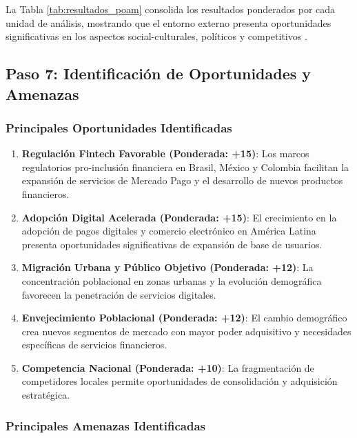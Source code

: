 La Tabla \ref{tab:resultados_poam} consolida los resultados ponderados por cada unidad de análisis, mostrando que el entorno externo presenta oportunidades significativas en los aspectos social-culturales, políticos y competitivos \autocite{porter1985}.

\subsection{Paso 7: Identificación de Oportunidades y Amenazas}

\subsubsection{Principales Oportunidades Identificadas}

\begin{enumerate}
\item \textbf{Regulación Fintech Favorable (Ponderada: +15)}: Los marcos regulatorios pro-inclusión financiera en Brasil, México y Colombia facilitan la expansión de servicios de Mercado Pago y el desarrollo de nuevos productos financieros.

\item \textbf{Adopción Digital Acelerada (Ponderada: +15)}: El crecimiento en la adopción de pagos digitales y comercio electrónico en América Latina presenta oportunidades significativas de expansión de base de usuarios.

\item \textbf{Migración Urbana y Público Objetivo (Ponderada: +12)}: La concentración poblacional en zonas urbanas y la evolución demográfica favorecen la penetración de servicios digitales.

\item \textbf{Envejecimiento Poblacional (Ponderada: +12)}: El cambio demográfico crea nuevos segmentos de mercado con mayor poder adquisitivo y necesidades específicas de servicios financieros.

\item \textbf{Competencia Nacional (Ponderada: +10)}: La fragmentación de competidores locales permite oportunidades de consolidación y adquisición estratégica.
\end{enumerate}

\subsubsection{Principales Amenazas Identificadas}

